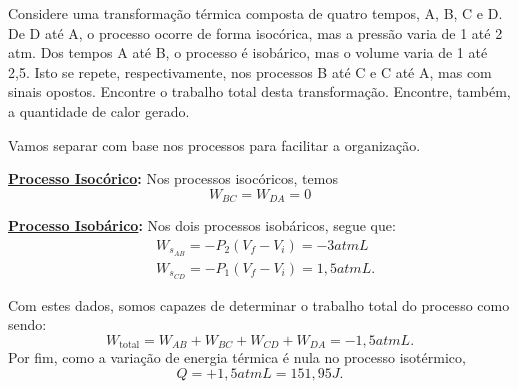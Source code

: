 \documentclass[PhysicsII/phsyicsII_notes.tex]{subfiles}
\begin{document}
\begin{example}
	Considere uma transformação térmica composta de quatro tempos, A, B, C e D. De D até A, o processo ocorre
	de forma isocórica, mas a pressão varia de 1 até 2 atm. Dos tempos A até B, o processo é isobárico, mas o volume varia
	de 1 até 2,5. Isto se repete, respectivamente, nos processos B até C e C até A, mas com sinais opostos. Encontre o trabalho total
	desta transformação. Encontre, também, a quantidade de calor gerado.

	Vamos separar com base nos processos para facilitar a organização.

	\textbf{\underline{Processo Isocórico}:}
	Nos processos isocóricos, temos
	\[
		W_{BC} = W_{DA} = 0
	\]

	\textbf{\underline{Processo Isobárico}:}
	Nos dois processos isobáricos, segue que:
	\begin{align*}
		 & W_{s_{AB}} = -P_{2}(V_{f}-V_{i}) = -3atmL   \\
		 & W_{s_{CD}} = -P_{1}(V_{f}-V_{i}) = 1,5atmL.
	\end{align*}

	Com estes dados, somos capazes de determinar o trabalho total do processo como sendo:
	\[
		W_{\text{total}} = W_{AB} + W_{BC} + W_{CD} + W_{DA} = -1,5atmL.
	\]
	Por fim, como a variação de energia térmica é nula no processo isotérmico,
	\[
		Q = +1,5atmL = 151,95J.
	\]
\end{example}
\end{document}
